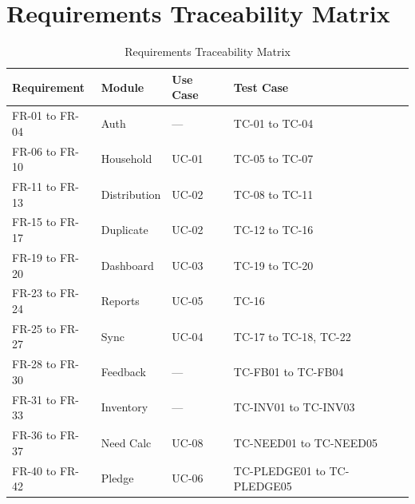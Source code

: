 \section{Requirements Traceability Matrix}
\begin{table}[H]
\centering
\caption{Requirements Traceability Matrix}
\label{tab:rtm}
\begin{tabularx}{\textwidth}{@{}lXXX@{}}
\toprule
Requirement & Module & Use Case & Test Case \\
\midrule
FR-01 to FR-04 & Auth & --- & TC-01 to TC-04 \\
FR-06 to FR-10 & Household & UC-01 & TC-05 to TC-07 \\
FR-11 to FR-13 & Distribution & UC-02 & TC-08 to TC-11 \\
FR-15 to FR-17 & Duplicate & UC-02 & TC-12 to TC-16 \\
FR-19 to FR-20 & Dashboard & UC-03 & TC-19 to TC-20 \\
FR-23 to FR-24 & Reports & UC-05 & TC-16 \\
FR-25 to FR-27 & Sync & UC-04 & TC-17 to TC-18, TC-22 \\
FR-28 to FR-30 & Feedback & --- & TC-FB01 to TC-FB04 \\
FR-31 to FR-33 & Inventory & --- & TC-INV01 to TC-INV03 \\
FR-36 to FR-37 & Need Calc & UC-08 & TC-NEED01 to TC-NEED05 \\
FR-40 to FR-42 & Pledge & UC-06 & TC-PLEDGE01 to TC-PLEDGE05 \\
\bottomrule
\end{tabularx}
\end{table}
